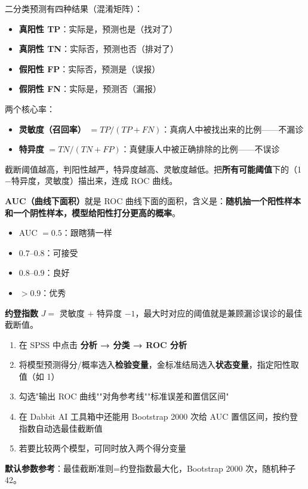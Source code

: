 \begin{algoprinciple}
二分类预测有四种结果（混淆矩阵）：

\begin{itemize}
    \item \textbf{真阳性 TP}：实际是，预测也是（找对了）
    \item \textbf{真阴性 TN}：实际否，预测也否（排对了）
    \item \textbf{假阳性 FP}：实际否，预测是（误报）
    \item \textbf{假阴性 FN}：实际是，预测否（漏报）
\end{itemize}

两个核心率：
\begin{itemize}
    \item \textbf{灵敏度（召回率）} $= TP/(TP+FN)$：真病人中被找出来的比例——不漏诊
    \item \textbf{特异度} $= TN/(TN+FP)$：真健康人中被正确排除的比例——不误诊
\end{itemize}

截断阈值越高，判阳性越严，特异度越高、灵敏度越低。把\textbf{所有可能阈值}下的（1$-$特异度，灵敏度）描出来，连成 ROC 曲线。

\textbf{AUC（曲线下面积）}就是 ROC 曲线下面的面积，含义是：\textbf{随机抽一个阳性样本和一个阴性样本，模型给阳性打分更高的概率}。
\begin{itemize}
    \item AUC $=0.5$：跟瞎猜一样
    \item $0.7$--$0.8$：可接受
    \item $0.8$--$0.9$：良好
    \item $>0.9$：优秀
\end{itemize}

\textbf{约登指数} $J=$ 灵敏度 $+$ 特异度 $-1$，最大时对应的阈值就是兼顾漏诊误诊的最佳截断值。
\end{algoprinciple}

\begin{algosposs}
\begin{enumerate}
    \item 在 SPSS 中点击 \textbf{分析 → 分类 → ROC 分析}
    \item 将模型预测得分/概率选入\textbf{检验变量}，金标准结局选入\textbf{状态变量}，指定阳性取值（如 1）
    \item 勾选"输出 ROC 曲线""对角参考线""标准误差和置信区间"
    \item 在 Dabbit AI 工具箱中还能用 Bootstrap 2000 次给 AUC 置信区间，按约登指数自动选最佳截断值
    \item 若要比较两个模型，可同时放入两个得分变量
\end{enumerate}

\textbf{默认参数参考}：最佳截断准则=约登指数最大化，Bootstrap 2000 次，随机种子 42。
\end{algosposs}

